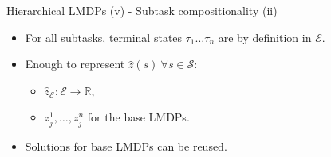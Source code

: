 \documentclass{beamer}
\theoremstyle{mystyle}
\newtheorem*{remark}{Remark}
\newcommand{\cE}{\mathcal{E}}
\newcommand{\cS}{\mathcal{S}}
\begin{document}
\begin{frame}{Hierarchical LMDPs (v) - Subtask compositionality (ii)}


    \begin{itemize}


        \item For all subtasks, terminal states $\tau_1 \dots \tau_n$ are by definition in $\cE$.
        \item Enough to represent $\hat z(s) \ \forall s \in \cS$:
              \begin{itemize}
                  \item $\hat{z}_\cE:\cE\rightarrow\mathbb{R}$,
                  \item {\color{blue} $z_j^1,\ldots,z_j^n$} for the base LMDPs.
              \end{itemize}
        \item Solutions for base LMDPs {\color{blue} can be reused}.

    \end{itemize}

\end{frame}



%    
%    
%    
%    
\end{document}
